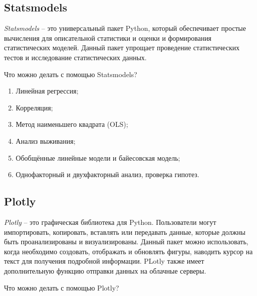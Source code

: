 \subsection{Statsmodels}

\textit{Statsmodels} -- это универсальный пакет Python, который обеспечивает простые вычисления для описательной статистики и оценки и формирования статистических моделей. Данный пакет упрощает проведение статистических тестов и исследование статистических данных.

Что можно делать с помощью Statsmodels?

\begin{enumerate}
	\item Линейная регрессия;
	\item Корреляция;
	\item Метод наименьшего квадрата (OLS);
	\item Анализ выживания;
	\item Обобщённые линейные модели и байесовская модель;
	\item Однофакторный и двухфакторный анализ, проверка гипотез.
\end{enumerate}

\subsection{Plotly}

\textit{Plotly} -- это графическая библиотека для Python. Пользователи могут импортировать, копировать, вставлять или передавать данные, которые должны быть проанализированы и визуализированы. Данный пакет можно использовать, когда необходимо создовать, отображать и обновлять фигуры, наводить курсор на текст для получения подробной информации. PLotly также имеет дополнительную функцию отправки данных на облачные серверы.

Что можно делать с помощью Plotly?

